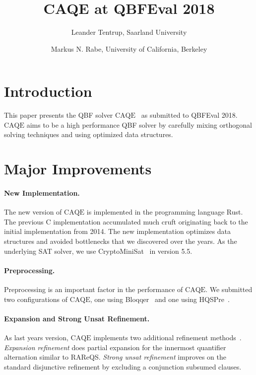\documentclass[11pt,twocolumn]{article}
\title{CAQE at QBFEval 2018}
\author{Leander Tentrup, Saarland University \and Markus N. Rabe, University of California, Berkeley}
\date{}
\newcommand{\caqe}{\text{CAQE}}
\begin{document}
\maketitle
  
\section{Introduction}

This paper presents the QBF solver $\caqe$~\cite{conf/fmcad/RabeT15} as submitted to QBFEval 2018.
$\caqe$ aims to be a high performance QBF solver by carefully mixing orthogonal solving techniques and using optimized data structures.

\section{Major Improvements}

\paragraph{New Implementation.}

The new version of $\caqe$ is implemented in the programming language Rust.
The previous C implementation accumulated much cruft originating back to the initial implementation from 2014.
The new implementation optimizes data structures and avoided bottlenecks that we discovered over the years.
As the underlying SAT solver, we use CryptoMiniSat~\cite{conf/sat/SoosNC09} in version 5.5.

\paragraph{Preprocessing.}

Preprocessing is an important factor in the performance of $\caqe$.
We submitted two configurations of $\caqe$, one using Bloqqer~\cite{conf/cade/BiereLS11} and one using HQSPre~\cite{conf/tacas/WimmerRM017}.

\paragraph{Expansion and Strong Unsat Refinement.}

As last years version, $\caqe$ implements two additional refinement methods~\cite{conf/cav/Tentrup17}.
\emph{Expansion refinement} does partial expansion for the innermost quantifier alternation similar to RAReQS.
\emph{Strong unsat refinement} improves on the standard disjunctive refinement by excluding a conjunction subsumed clauses.
\end{document}
